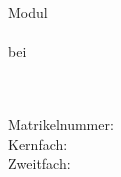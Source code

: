 
\fancyhead[LE]{\small\thepage \quad \small\textit{\kurztitel}}
\fancyhead[RO]{\small\textit{\kurztitel} \quad \small\thepage}

\ifx\event\undefined
\else
	\date[\mydate]{\today}
\fi

\expandafter\def\expandafter\quote\expandafter{\quote\onehalfspacing}

\doublespacing


\setcounter{page}{-1}


\thispagestyle{empty}
\begin{titlepage}
\singlespacing

\quad \\[4cm]

\begin{center}
\begin{minipage}{0.8\linewidth}
\begin{center}
\textsc{\MakeLowercase{\autor}} \\[1cm]
{%
    \scshape\Large\onehalfspacing
    \titel \par}
\end{center}
\end{minipage}

\vskip 3.8cm
\emph{\art}
\end{center}

\vfill


\noindent\begin{minipage}{0.5\linewidth}
Modul \emph{\modul} \\
\veranstaltung \\
bei \dozentin \\
\institut \\
\universitaet
\end{minipage}
\begin{minipage}{0.5\linewidth}
\begin{flushright}
\email \\
Matrikelnummer: \matrikelnummer \\
Kernfach:  \\
Zweitfach: \zweitfach \\
\datum
\end{flushright}
\end{minipage}



\end{titlepage}

\pagebreak

